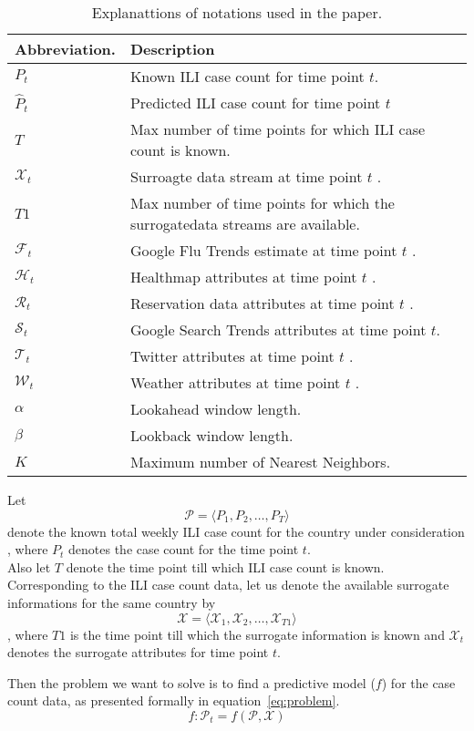 
\begin{table*}[t!]
  \centering
  \begin{tabular}{|*{2}{l|}}
    \hline
    Abbreviation. & Description \\
    \hline \hline
    ${P}_t$         & Known ILI case count for time point $t$.\\
    $\hat{P}_t$     & Predicted ILI case count for time point $t$ \\
    $T$             & Max number of time points for which ILI case count is known.\\
    $\mathcal{X}_t$ & Surroagte data stream at time point $t$ .\\
    $T1$            & Max number of time points for which the surrogatedata streams are available.\\
    $\mathcal{F}_t$ & Google Flu Trends estimate at time point $t$ .\\
    $\mathcal{H}_t$ & Healthmap attributes at time point $t$ .\\
    $\mathcal{R}_t$ & Reservation data attributes at time point $t$ .\\
    $\mathcal{S}_t$ & Google Search Trends attributes at time point $t$.\\
    $\mathcal{T}_t$ & Twitter attributes at time point $t$ .\\
    $\mathcal{W}_t$ & Weather attributes at time point $t$ .\\
    $\alpha$        & Lookahead window length.\\
    $\beta$         & Lookback window length.\\
    $K$             & Maximum number of Nearest Neighbors.\\
    \hline
  \end{tabular}
  \caption{\label{tb:notations} Explanattions of notations used in the paper.
  }
\end{table*}

Let
\[\mathcal{P} = \langle {P}_1, {P}_2, \dots,{P}_T \rangle\]
denote the known total weekly ILI case count for the country under
consideration , where ${P}_t$  denotes the case count for
the time point $t$.\\
Also let $T$ denote the time point till which ILI case count is known.
Corresponding to the ILI case count data, let us denote the available surrogate informations
for the same country by 
\[\mathcal{X} = \langle \mathcal{X}_1, \mathcal{X}_2, \dots, \mathcal{X}_{T1}\rangle\]
, where $T1$ is the time point till which the surrogate
information is known and $\mathcal{X}_{t}$ denotes the surrogate attributes for time
point $t$. 

Then the problem we want to solve is to find a predictive model ($f$)  for the 
case count data, as presented formally in equation~\ref{eq:problem}.
\begin{equation}
  \label{eq:problem}
  f: \mathcal{P}_t = f\left(\mathcal{P}, \mathcal{X}\right)
\end{equation}


